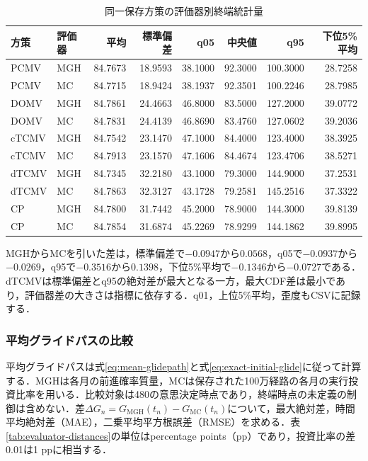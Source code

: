 \documentclass[10pt,a4paper]{article}
\theoremstyle{plain}
\theoremstyle{definition}
\begin{document}
\begin{table}[H]
\centering\scriptsize
\caption{同一保存方策の評価器別終端統計量}
\label{tab:evaluator-distribution}
\begin{tabular}{llrrrrrr}\toprule
方策 & 評価器 & 平均 & 標準偏差 & q05 & 中央値 & q95 & 下位5\%平均\\\midrule
PCMV & MGH & 84.7673 & 18.9593 & 38.1000 & 92.3000 & 100.3000 & 28.7258 \\
PCMV & MC & 84.7715 & 18.9424 & 38.1937 & 92.3501 & 100.2246 & 28.7985 \\
DOMV & MGH & 84.7861 & 24.4663 & 46.8000 & 83.5000 & 127.2000 & 39.0772 \\
DOMV & MC & 84.7831 & 24.4139 & 46.8690 & 83.4760 & 127.0602 & 39.2036 \\
cTCMV & MGH & 84.7542 & 23.1470 & 47.1000 & 84.4000 & 123.4000 & 38.3925 \\
cTCMV & MC & 84.7913 & 23.1570 & 47.1606 & 84.4674 & 123.4706 & 38.5271 \\
dTCMV & MGH & 84.7345 & 32.2180 & 43.1000 & 79.3000 & 144.9000 & 37.2531 \\
dTCMV & MC & 84.7863 & 32.3127 & 43.1728 & 79.2581 & 145.2516 & 37.3322 \\
CP & MGH & 84.7800 & 31.7442 & 45.2000 & 78.9000 & 144.3000 & 39.8139 \\
CP & MC & 84.7854 & 31.6874 & 45.2269 & 78.9299 & 144.1862 & 39.8995 \\
\bottomrule\end{tabular}
\end{table}

MGHからMCを引いた差は，標準偏差で$-0.0947$から$0.0568$，q05で$-0.0937$から$-0.0269$，q95で$-0.3516$から$0.1398$，下位5\%平均で$-0.1346$から$-0.0727$である．dTCMVは標準偏差とq95の絶対差が最大となる一方，最大CDF差は最小であり，評価器差の大きさは指標に依存する．q01，上位5\%平均，歪度もCSVに記録する．

\subsubsection{平均グライドパスの比較}

平均グライドパスは式\eqref{eq:mean-glidepath}と式\eqref{eq:exact-initial-glide}に従って計算する．MGHは各月の前進確率質量，MCは保存された100万経路の各月の実行投資比率を用いる．比較対象は480の意思決定時点であり，終端時点の未定義の制御は含めない．差$\Delta G_n=G_{\mathrm{MGH}}(t_n)-G_{\mathrm{MC}}(t_n)$について，最大絶対差，時間平均絶対差（MAE），二乗平均平方根誤差（RMSE）を求める．表\ref{tab:evaluator-distances}の単位はpercentage points（pp）であり，投資比率の差0.01は1 ppに相当する．
\end{document}
